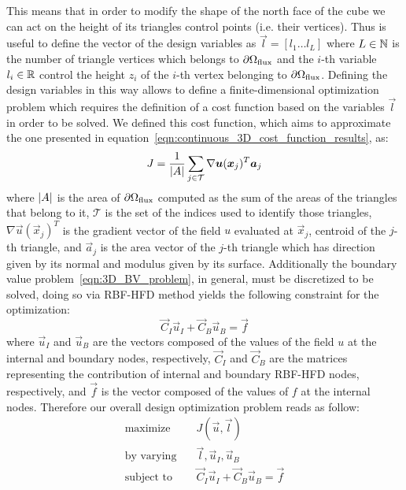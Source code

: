 This means that in order to modify the shape of the north face of the cube we can act on the height of its triangles control points (i.e. their vertices). Thus is useful to define the vector of the design variables as $\vec{l} = [l_1 \dots l_L]$ where $L \in \mathbb{N}$ is the number of triangle vertices which belongs to $\partial\Omega_\textup{flux}$ and the $i$-th variable $l_i \in \mathbb{R}$ control the height $z_i$ of the $i$-th vertex belonging to $\partial\Omega_\textup{flux}$. Defining the design variables in this way allows to define a finite-dimensional optimization problem which requires the definition of a cost function based on the variables $\vec{l}$ in order to be solved. We defined this cost function, which aims to approximate the one presented in equation~\eqref{eqn:continuous_3D_cost_function_results}, as:
\begin{equation}
	J = \frac{1}{\lvert A\rvert} \sum_{j \in \mathcal{T}} \nabla \boldsymbol{u}(\boldsymbol{x}_j)^T \boldsymbol{a}_j
\end{equation}
where $\lvert A\rvert$ is the area of $\partial\Omega_\textup{flux}$ computed as the sum of the areas of the triangles that belong to it, $\mathcal{T}$ is the set of the indices used to identify those triangles, $\nabla \vec{u}(\vec{x}_j)^T$ is the gradient vector of the field $u$ evaluated at $\vec{x}_j$, centroid of the $j$-th triangle, and $\vec{a}_j$ is the area vector of the $j$-th triangle which has direction given by its normal and modulus given by its surface.
Additionally the boundary value problem~\eqref{eqn:3D_BV_problem}, in general, must be discretized to be solved, doing so via RBF-HFD method yields the following constraint for the optimization:
\begin{equation}
	\label{eqn:3D_design_opt_constraint}
	\vec{C}_I\vec{u}_I + \vec{C}_B\vec{u}_B = \vec{f}
\end{equation}
where $\vec{u}_I$ and $\vec{u}_B$ are the vectors composed of the values of the field $u$ at the internal and boundary nodes, respectively, $\vec{C}_I$ and $ \vec{C}_B$ are the matrices representing the contribution of internal and boundary RBF-HFD nodes, respectively, and $\vec{f}$ is the vector composed of the values of $f$ at the internal nodes.
Therefore our overall design optimization problem reads as follow:
\begin{equation}
	\label{eqn:3D_design_opt_problem}
	\begin{aligned}
		\text{maximize} 		&  \quad J(\vec{u}, \vec{l})  									\\
		\text{by varying} 		&  \quad \vec{l}, \vec{u}_I, \vec{u}_B							\\
		\text{subject to}	 	&  \quad \vec{C}_I\vec{u}_I + \vec{C}_B\vec{u}_B = \vec{f}
	\end{aligned}
\end{equation}

